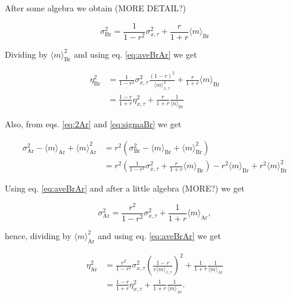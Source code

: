 After some algebra we obtain (MORE DETAIL?)

\begin{equation}
  \label{eq:sigmaBr}
  \sigma^2_\text{Br} = \frac{1}{1-r^2}\sigma^2_{x,\tau}+\frac{r}{1+r}\langle m\rangle_\text{Br}
\end{equation}

Dividing by $\langle m\rangle_\text{Br}^2$ and using eq. \ref{eq:aveBrAr} we get

\begin{equation}
  \begin{split}
    \eta_\text{Br}^2 &= \frac{1}{1-r^2}\sigma_{x,\tau}^2\frac{(1-r)^2}{\langle m\rangle_{x,\tau}^2} + \frac{r}{1+r}\langle m\rangle_\text{Br}\\
    & = \frac{1-r}{1+r}\eta_{x,\tau}^2+\frac{r}{1+r}\frac{1}{\langle n\rangle_\text{Br}}
  \end{split}
\end{equation}

Also, from eqs. \ref{eq:2Ar} and \ref{eq:sigmaBr} we get

\begin{equation}
  \begin{split}
    \sigma^2_\text{Ar} - \langle m\rangle_\text{Ar} + \langle m\rangle_\text{Ar}^2 &= r^2\left(\sigma^2_\text{Br}- \langle m\rangle_\text{Br} + \langle m\rangle^2_\text{Br}\right)\\
  &=r^2\left(\frac{1}{1-r^2}\sigma^2_{x,\tau}+\frac{r}{1+r}\langle m\rangle_\text{Br}\right)-r^2\langle m\rangle_\text{Br} + r^2\langle m\rangle^2_\text{Br}
  \end{split}
\end{equation}

Using eq. \ref{eq:aveBrAr} and after a little algebra (MORE?) we get

\begin{equation}
  \sigma^2_\text{Ar} = \frac{r^2}{1-r^2}\sigma^2_{x,\tau}+\frac{1}{1+r}\langle m\rangle_\text{Ar},
\end{equation}

hence, dividing by $\langle m\rangle_\text{Ar}^2$ and using eq. \ref{eq:aveBrAr} we get

\begin{equation}
  \begin{split}
    \eta^2_\text{Ar} &= \frac{r^2}{1-r^2}\sigma^2_{x,\tau}\left(\frac{1-r}{r\langle m\rangle_{x,\tau}}\right)^2+\frac{1}{1+r}\frac{1}{\langle m\rangle_\text{Ar}}\\
    &=\frac{1-r}{1+r}\eta^2_{x,\tau}+\frac{1}{1+r}\frac{1}{\langle m\rangle_\text{Ar}}.
  \end{split}
\end{equation}


